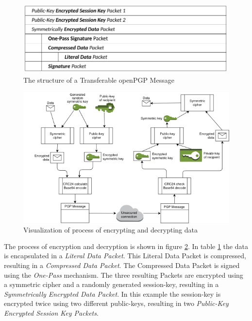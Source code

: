 \begin{figure}[h!]
	\centering
	\includegraphics[width=1\linewidth]{figures/transferable-msg.png}
	\caption{The structure of a Transferable openPGP Message}
	\label{fig:transferable-msg}
\end{figure}



\begin{figure}[h!]
	\centering
	\includegraphics[width=1\linewidth]{figures/encryption}
	\caption{Visualization of process of encrypting and decrypting data}
	\label{fig:encryption}
\end{figure}


The process of encryption and decryption is shown in figure \ref{fig:encryption}. In table \ref{fig:transferable-msg} the data is encapsulated in a\textit{ Literal Data Packet}. This Literal Data Packet is compressed, resulting in a \textit{Compressed Data Packet}. The Compressed Data Packet is signed using the \textit{One-Pass} mechanism. The three resulting Packets are encrypted using a symmetric cipher and a randomly generated session-key, resulting in a \textit{Symmetrically Encrypted Data Packet}. In this example the session-key is encrypted twice using two different public-keys, resulting in two \textit{Public-Key Encrypted Session Key Packets}. \\


